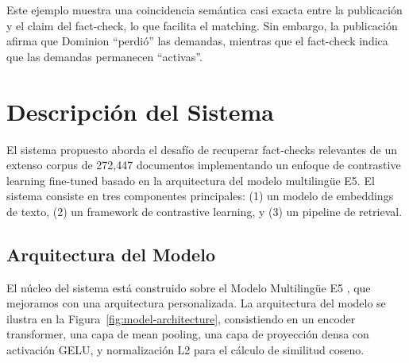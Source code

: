 \documentclass[a4paper,openany]{memoir}
\begin{document}
Este ejemplo muestra una coincidencia semántica casi exacta entre la publicación y el claim del fact-check, lo que facilita el matching. Sin embargo, la publicación afirma que Dominion ``perdió'' las demandas, mientras que el fact-check indica que las demandas permanecen ``activas''.

\chapter{Descripción del Sistema}

El sistema propuesto aborda el desafío de recuperar fact-checks relevantes de un extenso corpus de 272,447 documentos implementando un enfoque de contrastive learning fine-tuned basado en la arquitectura del modelo multilingüe E5. El sistema consiste en tres componentes principales: (1) un modelo de embeddings de texto, (2) un framework de contrastive learning, y (3) un pipeline de retrieval.

\section{Arquitectura del Modelo}

El núcleo del sistema está construido sobre el Modelo Multilingüe E5 \cite{wang2024multilingual}, que mejoramos con una arquitectura personalizada. La arquitectura del modelo se ilustra en la Figura~\ref{fig:model-architecture}, consistiendo en un encoder transformer, una capa de mean pooling, una capa de proyección densa con activación GELU, y normalización L2 para el cálculo de similitud coseno.
\end{document}

